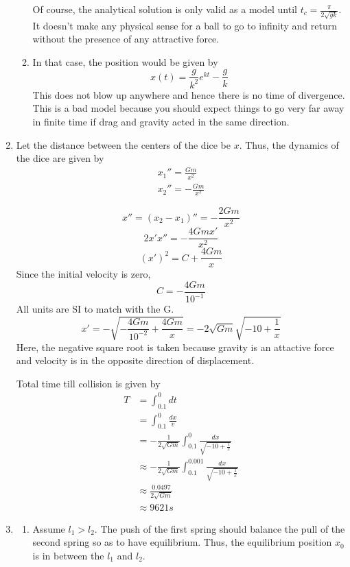 \documentclass[letterpaper,12pt]{article}
\begin{document}
\begin{enumerate}
\begin{enumerate}
Of course, the analytical solution is only valid as a model until $t_c = \frac{\pi}{2\sqrt{gk}}$. It doesn't make any physical sense for a ball to go to infinity and return without the presence of any attractive force.
\item

In that case, the position would be given by
\[x(t)= \frac{g}{k^2}e^{kt}-\frac{g}{k}\]
This does not blow up anywhere and hence there is no time of divergence.
This is a bad model because you should expect things to go very far away in finite time if drag and gravity acted in the same direction.

\end{enumerate}


\item
 Let the distance between the centers of the dice be $x$. Thus, the dynamics of the dice are given by
 \begin{align*}
x_1'' = \frac{Gm}{x^2}\\
x_2'' = -\frac{Gm}{x^2}\end{align*}

\[x'' = (x_2-x_1)'' = -\frac{2Gm}{x^2}\]
\[2x'x''  = -\frac{4Gmx'}{x^2}\]
\[(x')^2  = C+\frac{4Gm}{x}\]
Since the initial velocity is zero,
\[ C=- \frac{4Gm}{10^{-1}}\]
All units are SI to match with the G.
\[ x' = - \sqrt{- \frac{4Gm}{10^{-2}}+\frac{4Gm}{x}}=- 2\sqrt{Gm}\sqrt{- 10+\frac{1}{x}}\]
Here, the negative square root is taken because gravity is an attactive force and velocity is in the opposite direction of displacement.

Total time till collision is given by
\begin{align*}
T &= \int_{0.1}^0 dt\\
&= \int_{0.1}^0 \frac{dx}{v}\\
&= - \frac{1}{2\sqrt{Gm}} \int_{0.1}^0 \frac{dx}{\sqrt{- 10+\frac{1}{x}}}\\
&\approx - \frac{1}{2\sqrt{Gm}} \int_{0.1}^{0.001} \frac{dx}{\sqrt{- 10+\frac{1}{x}}}\\
&\approx \frac{0.0497}{2\sqrt{Gm}} \\
&\approx 9621 s
\end{align*}
\item
\begin{enumerate}
\item

Assume $l_1 > l_2$. The push of the first spring should balance the pull of the second spring so as to have equilibrium. Thus, the equilibrium position $x_0$ is in between the $l_1$ and $l_2$.


\end{enumerate}
\end{enumerate}
\end{document}
